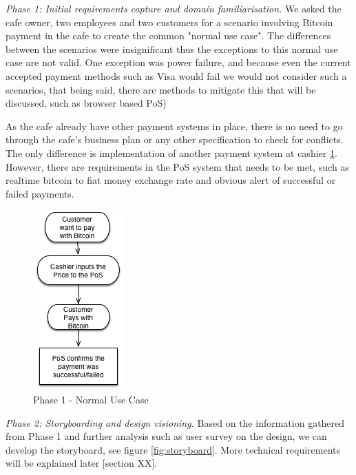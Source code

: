 \textit{Phase 1: Initial requirements capture and domain familiarisation.} We asked the cafe owner, two employees and two customers for a scenario involving Bitcoin payment in the cafe to create the common "normal use case". The differences between the scenarios were insignificant thus the exceptions to this normal use case are not valid. One exception was power failure, and because even the current accepted payment methods such as Visa would fail we would not consider such a scenarios, that being said, there are methods to mitigate this that will be discussed, such as browser based PoS)


As the cafe already have other payment systems in place, there is no need to go through the cafe's business plan or any other specification to check for conflicts. The only difference is implementation of another payment system at cashier \ref{fig:phase1}.
However, there are requirements in the PoS system that needs to be met, such as realtime bitcoin to fiat money exchange rate and obvious alert of successful or failed payments.

\begin{figure}[htb]
\centering
\includegraphics[scale=0.5]{fig/RE_Scenario_Phase1}
  \caption{Phase 1 - Normal Use Case}
\label{fig:phase1}
\end{figure}


\textit{Phase 2: Storyboarding and design visioning.}
Based on the information gathered from Phase 1 and further analysis such as user survey on the design, we can develop the storyboard, see figure \ref{fig:storyboard}. More technical requirements will be explained later [section XX].

